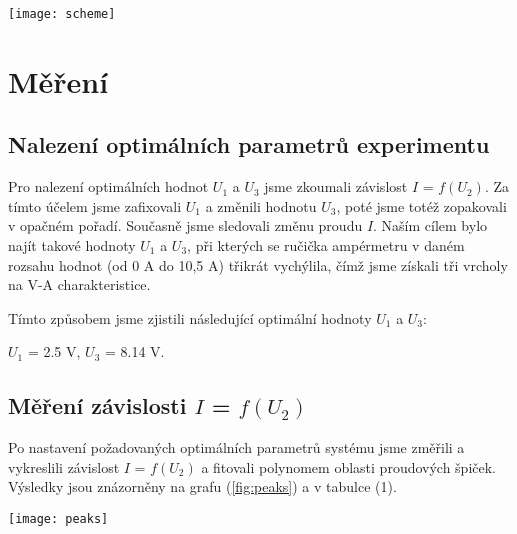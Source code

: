 \documentclass[a4paper,11pt]{article}
\begin{document}
    \begin{minipage}[t]{0.5\textwidth} 
                \vspace{0pt}   
                \par \centering
                \texttt{[image: scheme]}
                \captionsetup{justification=centering, font=footnotesize}
                \label{fig:scheme}
                \vspace{10pt}
                \raggedright

        \section{Měření}   
            \subsection{Nalezení optimálních parametrů experimentu}
                Pro nalezení optimálních hodnot $U_1$ a $U_3$ jsme zkoumali závislost $I$ = $f(U_2)$. Za tímto účelem jsme zafixovali $U_1$ a změnili hodnotu $U_3$, poté jsme totéž zopakovali v opačném pořadí. Současně jsme sledovali změnu proudu $I$. Naším cílem bylo najít takové hodnoty $U_1$ a $U_3$, při kterých se ručička ampérmetru v daném rozsahu hodnot (od 0 A do 10,5 A) třikrát vychýlila, čímž jsme získali tři vrcholy na V-A charakteristice.

                \par Tímto způsobem jsme zjistili následující optimální hodnoty $U_1$ a $U_3$: 
                \begin{center}
                    $U_1$ = 2.5 V, $U_3$ = 8.14 V.
                \end{center}

            \subsection{Měření závislosti $I$ = $f(U_2)$}
                Po nastavení požadovaných optimálních parametrů systému jsme změřili a vykreslili závislost $I$ = $f(U_2)$ a fitovali polynomem oblasti proudových špiček. Výsledky jsou znázorněny na grafu (\ref{fig:peaks}) a v tabulce (1).

                \vspace{10pt}   
                \par \centering
                \texttt{[image: peaks]}
                \captionsetup{justification=centering, font=footnotesize}
                \label{fig:peaks}
                \vspace{10pt}
                \raggedright 
    \end{minipage}
\end{document}
